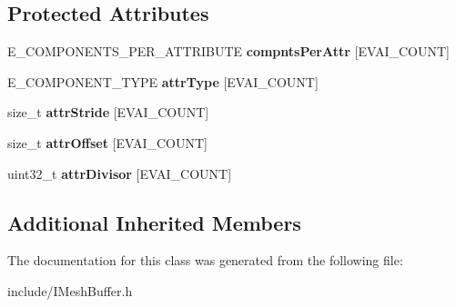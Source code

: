 \subsection*{Protected Attributes}
\begin{DoxyCompactItemize}
\item 
E\+\_\+\+C\+O\+M\+P\+O\+N\+E\+N\+T\+S\+\_\+\+P\+E\+R\+\_\+\+A\+T\+T\+R\+I\+B\+U\+TE {\bfseries compnts\+Per\+Attr} \mbox{[}E\+V\+A\+I\+\_\+\+C\+O\+U\+NT\mbox{]}\hypertarget{classirr_1_1scene_1_1IMeshDataFormatDesc_a3a40a6d342dafa80dc998208f9b9ee30}{}\label{classirr_1_1scene_1_1IMeshDataFormatDesc_a3a40a6d342dafa80dc998208f9b9ee30}

\item 
E\+\_\+\+C\+O\+M\+P\+O\+N\+E\+N\+T\+\_\+\+T\+Y\+PE {\bfseries attr\+Type} \mbox{[}E\+V\+A\+I\+\_\+\+C\+O\+U\+NT\mbox{]}\hypertarget{classirr_1_1scene_1_1IMeshDataFormatDesc_a08caf005474f007de70b2852fa976c0d}{}\label{classirr_1_1scene_1_1IMeshDataFormatDesc_a08caf005474f007de70b2852fa976c0d}

\item 
size\+\_\+t {\bfseries attr\+Stride} \mbox{[}E\+V\+A\+I\+\_\+\+C\+O\+U\+NT\mbox{]}\hypertarget{classirr_1_1scene_1_1IMeshDataFormatDesc_a728b3f3df3f5d7a905cbdd79eb34036f}{}\label{classirr_1_1scene_1_1IMeshDataFormatDesc_a728b3f3df3f5d7a905cbdd79eb34036f}

\item 
size\+\_\+t {\bfseries attr\+Offset} \mbox{[}E\+V\+A\+I\+\_\+\+C\+O\+U\+NT\mbox{]}\hypertarget{classirr_1_1scene_1_1IMeshDataFormatDesc_a41c18f15fadfaf04fdbd14cde995a1d6}{}\label{classirr_1_1scene_1_1IMeshDataFormatDesc_a41c18f15fadfaf04fdbd14cde995a1d6}

\item 
uint32\+\_\+t {\bfseries attr\+Divisor} \mbox{[}E\+V\+A\+I\+\_\+\+C\+O\+U\+NT\mbox{]}\hypertarget{classirr_1_1scene_1_1IMeshDataFormatDesc_a753628e19b1f0a60eca390692d825d4d}{}\label{classirr_1_1scene_1_1IMeshDataFormatDesc_a753628e19b1f0a60eca390692d825d4d}

\end{DoxyCompactItemize}
\subsection*{Additional Inherited Members}


The documentation for this class was generated from the following file\+:\begin{DoxyCompactItemize}
\item 
include/I\+Mesh\+Buffer.\+h\end{DoxyCompactItemize}
